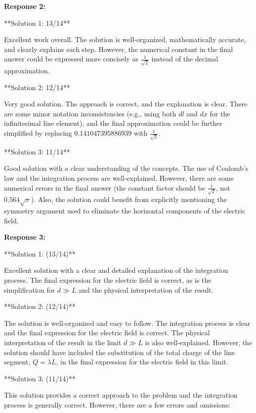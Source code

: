 \documentclass[a4paper,11pt]{article}
\begin{document}
\bigskip    
\textbf{Response 2:}

**Solution 1: 13/14**

Excellent work overall. The solution is well-organized, mathematically accurate, and clearly explains each step. However, the numerical constant in the final answer could be expressed more concisely as  \( \frac{1}{\sqrt{2}} \) instead of the decimal approximation.

**Solution 2: 12/14**

Very good solution. The approach is correct, and the explanation is clear. There are some minor notation inconsistencies (e.g., using both \( dl \) and \( dx \) for the infinitesimal line element), and the final approximation could be further simplified by replacing \( 0.141047395886939 \) with \( \frac{1}{\sqrt{2}} \).

**Solution 3: 11/14**

Good solution with a clear understanding of the concepts. The use of Coulomb's law and the integration process are well-explained. However, there are some numerical errors in the final answer (the constant factor should be \( \frac{1}{\sqrt{2}} \), not \( 0.564 \sqrt{\pi} \)). Also, the solution could benefit from explicitly mentioning the symmetry argument used to eliminate the horizontal components of the electric field.

\bigskip    
\textbf{Response 3:}

**Solution 1: (13/14)**

Excellent solution with a clear and detailed explanation of the integration process. The final expression for the electric field is correct, as is the simplification for \( d \gg L \) and the physical interpretation of the result.

**Solution 2: (12/14)**

The solution is well-organized and easy to follow. The integration process is clear and the final expression for the electric field is correct. The physical interpretation of the result in the limit \( d \gg L \) is also well-explained. However, the solution should have included the substitution of the total charge of the line segment, \( Q = \lambda L \), in the final expression for the electric field in this limit.

**Solution 3: (11/14)**

This solution provides a correct approach to the problem and the integration process is generally correct. However, there are a few errors and omissions:
\end{document}
